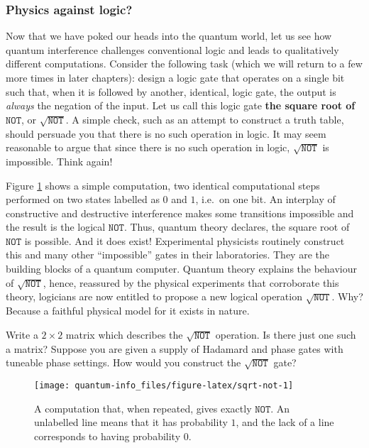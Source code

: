 \documentclass[fleqn]{article}
\begin{document}
\hypertarget{physics-against-logic}{%
\subsubsection{Physics against logic?}\label{physics-against-logic}}

Now that we have poked our heads into the quantum world, let us see how quantum interference challenges conventional logic and leads to qualitatively different computations.
Consider the following task (which we will return to a few more times in later chapters): design a logic gate that operates on a single bit such that, when it is followed by another, identical, logic gate, the output is \emph{always} the negation of the input.
Let us call this logic gate \textbf{the square root of \(\texttt{NOT}\)}, or \(\sqrt{\texttt{NOT}}\).
A simple check, such as an attempt to construct a truth table, should persuade you that there is no such operation in logic.
It may seem reasonable to argue that since there is no such operation in logic, \(\sqrt{\texttt{NOT}}\) is impossible.
Think again!

Figure \ref{fig:sqrt-not} shows a simple computation, two identical computational steps performed on two states labelled as \(0\) and \(1\), i.e.~on one bit.
An interplay of constructive and destructive interference makes some transitions impossible and the result is the logical \(\texttt{NOT}\).
Thus, quantum theory declares, the square root of \(\texttt{NOT}\) is possible.
And it does exist!
Experimental physicists routinely construct this and many other ``impossible'' gates in their laboratories.
They are the building blocks of a quantum computer.
Quantum theory explains the behaviour of \(\sqrt{\texttt{NOT}}\), hence, reassured by the physical experiments that corroborate this theory, logicians are now entitled to propose a new logical operation \(\sqrt{\texttt{NOT}}\).
Why?
Because a faithful physical model for it exists in nature.

Write a \(2\times 2\) matrix which describes the \(\sqrt{\texttt{NOT}}\) operation.
Is there just one such a matrix?
Suppose you are given a supply of Hadamard and phase gates with tuneable phase settings.
How would you construct the \(\sqrt{\texttt{NOT}}\) gate?



\begin{figure}[H]

{\centering \texttt{[image: quantum-info\_files/figure-latex/sqrt-not-1]} 

}

\caption{A computation that, when repeated, gives exactly \(\texttt{NOT}\). An unlabelled line means that it has probability \(1\), and the lack of a line corresponds to having probability \(0\).}\label{fig:sqrt-not}
\end{figure}
\end{document}
